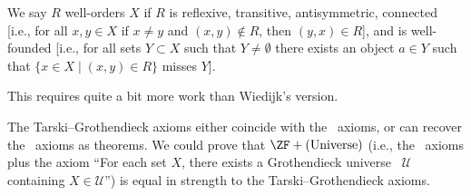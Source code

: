 \begin{node}[Axioms]
\begin{node}[Choice]
\begin{node}
We say $R$ well-orders $X$ if $R$ is reflexive, transitive,
antisymmetric, connected [i.e., for all $x,y\in X$ if $x\neq y$ and
  $(x,y)\notin R$, then $(y,x)\in R$], and is well-founded [i.e., for
  all sets $Y\subset X$ such that $Y\neq\emptyset$ there exists an
  object $a\in Y$ such that $\{x\in X\mid(x,y)\in R\}$ misses $Y$].

This requires quite a bit more work than Wiedijk's version.
\end{node}
\end{node} %

\begin{node}[Remarks]\label{set:zfc-000D}%
\begin{node}\label{set:zfc-000E}%
The Tarski--Grothendieck axioms 
either coincide with the \ZFC\ axioms, or can recover the \ZFC\ axioms
as theorems. We could prove that $\ZF+(\mbox{Universe})$ (i.e., the
\ZF\ axioms plus the axiom ``For each set $X$, there exists a Grothendieck universe~
$\mathcal{U}$ containing $X\in\mathcal{U}$'') is equal in strength to
the Tarski--Grothendieck axioms.
\end{node} %


\end{node}
\end{node}
